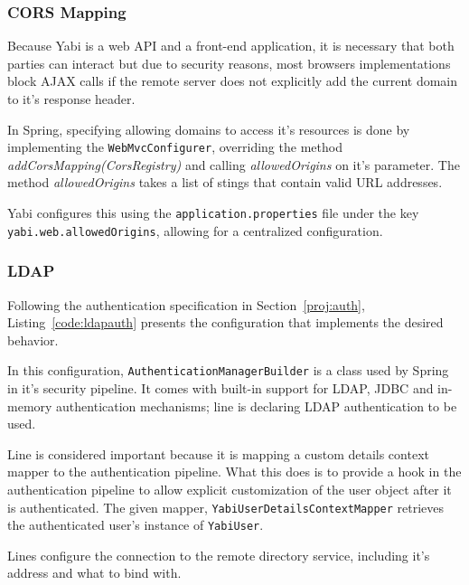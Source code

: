 \subsubsection{\gls{CORS} Mapping}

Because \gls{Yabi} is a web \gls{API} and a front-end application, it is necessary that both parties can interact but due to security reasons, most browsers implementations block \gls{AJAX} calls if the remote server does not explicitly add the current domain to it's response header.

In Spring, specifying allowing domains to access it's resources is done by implementing the \texttt{WebMvcConfigurer}, overriding the method \textit{addCorsMapping(CorsRegistry)} and calling \textit{allowedOrigins} on it's parameter. The method \textit{allowedOrigins} takes a list of stings that contain valid \gls{URL} addresses.

\gls{Yabi} configures this using the \texttt{application.properties} file under the key \texttt{yabi.web.allowedOrigins}, allowing for a centralized configuration.

\subsubsection{\gls{LDAP}}\label{impl:ldap}

Following the authentication specification in Section~\ref{proj:auth}, Listing~\ref{code:ldapauth} presents the configuration that implements the desired behavior.



In this configuration, \texttt{AuthenticationManagerBuilder} is a class used by Spring in it's security pipeline. It comes with built-in support for \gls{LDAP}, \gls{JDBC} and in-memory authentication mechanisms; line  is declaring \gls{LDAP} authentication to be used.

Line  is considered important because it is mapping a custom details context mapper to the authentication pipeline. What this does is to provide a hook in the authentication pipeline to allow explicit customization of the user object after it is authenticated. The given mapper, \texttt{YabiUserDetailsContextMapper} retrieves the authenticated user's instance of \texttt{YabiUser}.

Lines  configure the connection to the remote directory service, including it's address and what to bind with.

